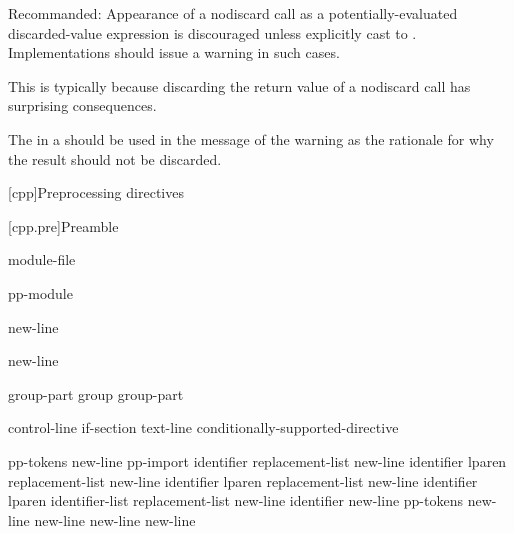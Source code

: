 \documentclass{wg21}
\begin{document}
Recommanded:
Appearance of a nodiscard call as
a potentially-evaluated discarded-value expression
is discouraged unless explicitly cast to .
Implementations should issue a warning in such cases.
\begin{note}
    This is typically because discarding the return value
    of a nodiscard call has surprising consequences.
\end{note}
The 
in a  
should be used in the message of the warning
as the rationale for why the result should not be discarded.


[cpp]{Preprocessing directives}%

[cpp.pre]{Preamble}

\begin{bnf}
    \br
    \br
    module-file
\end{bnf}

\begin{bnf}
    \br
     pp-module  
\end{bnf}

\begin{bnf}
    \br
     \terminal{;} new-line 
\end{bnf}

\begin{bnf}
    \br
     \terminal{:}  \terminal{;} new-line 
\end{bnf}

\begin{bnf}
    \br
    group-part\br
    group group-part
\end{bnf}

\begin{bnf}
    \br
    control-line\br
    if-section\br
    text-line\br
    \terminal{\#} conditionally-supported-directive
\end{bnf}

\begin{bnf}\obeyspaces
    \br
     pp-tokens new-line\br
    pp-import\br
     identifier replacement-list new-line\br
     identifier lparen  \terminal{)} replacement-list new-line\br
     identifier lparen  replacement-list new-line\br
     identifier lparen identifier-list  replacement-list new-line\br
     identifier new-line\br
     pp-tokens new-line\br
      new-line\br
      new-line\br
    \terminal{\# }new-line
\end{bnf}
\end{document}
